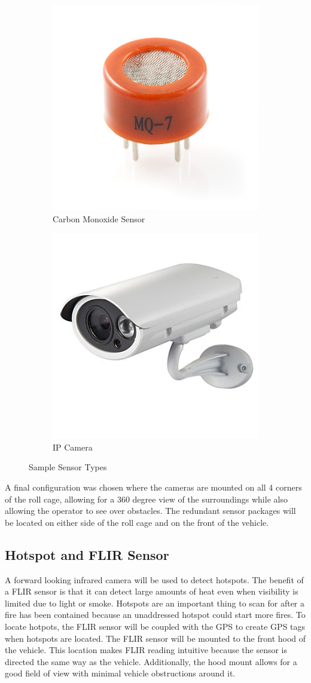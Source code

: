 \begin{figure}[H]
\centering
\begin{subfigure}{.5\textwidth}
  \centering
  \includegraphics[height=.5\linewidth]{cosensor}
  \caption{Carbon Monoxide Sensor}
  \label{fig:sub1}
\end{subfigure}%
\begin{subfigure}{.5\textwidth}
  \centering
  \includegraphics[height=.5\linewidth]{camera}
  \caption{IP Camera}
  \label{fig:sub2}
\end{subfigure}
\caption{Sample Sensor Types}
\label{fig:sensortest}
\end{figure}

A final configuration was chosen where the cameras are mounted on all 4 corners of the roll cage, allowing for a 360 degree view of the surroundings while also allowing the operator to see over obstacles. The redundant sensor packages will be located on either side of the roll cage and on the front of the vehicle. 

\subsection{Hotspot and FLIR Sensor}
A forward looking infrared camera will be used to detect hotspots. The benefit of a FLIR sensor is that it can detect large amounts of heat even when visibility is limited due to light or smoke. Hotspots are an important thing to scan for after a fire has been contained because an unaddressed hotspot could start more fires. To locate hotpots, the FLIR sensor will be coupled with the GPS to create GPS tags when hotspots are located. The FLIR sensor will be mounted to the front hood of the vehicle. This location makes FLIR reading intuitive because the sensor is directed the same way as the vehicle. Additionally, the hood mount allows for a good field of view with minimal vehicle obstructions around it. \\
 
